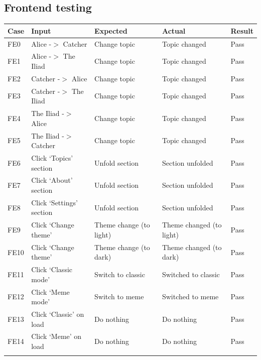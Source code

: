 \documentclass[12pt]{report}
\begin{document}
\begin{appendices}
\subsection*{Frontend testing}
\label{appendix:frontend_testing}

\begin{table}[ht]
  \centering
  \begin{tabular}{lllll}
  \toprule   
  {Case} & {Input} & {Expected} & {Actual} & {Result}\\
  \midrule
  FE0 & Alice -$>$ Catcher & Change topic & Topic changed & Pass\\ 
  \addlinespace[3pt]
  FE1 & Alice -$>$ The Iliad & Change topic & Topic changed & Pass\\
  \addlinespace[3pt]
  FE2 & Catcher -$>$ Alice & Change topic & Topic changed & Pass\\
  \addlinespace[3pt]
  FE3 & Catcher -$>$ The Iliad & Change topic & Topic changed & Pass\\
  \addlinespace[3pt]
  FE4 & The Iliad -$>$ Alice & Change topic & Topic changed & Pass\\
  \addlinespace[3pt]
  FE5 & The Iliad -$>$ Catcher & Change topic & Topic changed & Pass\\
  \addlinespace[3pt]
  FE6 & Click `Topics' section & Unfold section & Section unfolded & Pass\\
  \addlinespace[3pt]
  FE7 & Click `About' section & Unfold section & Section unfolded & Pass\\
  \addlinespace[3pt]
  FE8 & Click `Settings' section & Unfold section & Section unfolded & Pass\\
  \addlinespace[3pt]
  FE9 & Click `Change theme' & Theme change (to light) & Theme changed (to light) & Pass\\
  \addlinespace[3pt]
  FE10 & Click `Change theme' & Theme change (to dark) & Theme changed (to dark) & Pass\\
  \addlinespace[3pt]
  FE11 & Click `Classic mode' & Switch to classic & Switched to classic & Pass\\
  \addlinespace[3pt]
  FE12 & Click `Meme mode' & Switch to meme & Switched to meme & Pass\\
  \addlinespace[3pt]
  FE13 & Click `Classic' on load & Do nothing & Do nothing & Pass\\
  \addlinespace[3pt]
  FE14 & Click `Meme' on load & Do nothing & Do nothing & Pass\\
  \addlinespace[3pt]

\end{tabular}
\end{table}
\end{appendices}
\end{document}
